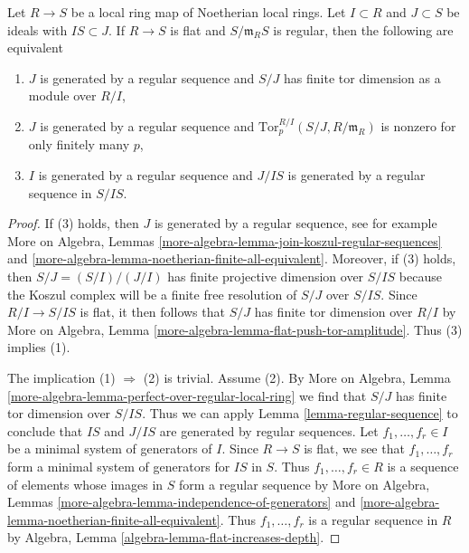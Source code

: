 \begin{lemma}
\label{lemma-perfect-map-ci}
Let $R \to S$ be a local ring map of Noetherian local rings.
Let $I \subset R$ and $J \subset S$ be ideals with
$IS \subset J$. If $R \to S$ is flat and $S/\mathfrak m_RS$ is
regular, then the following are equivalent
\begin{enumerate}
\item $J$ is generated by a regular sequence and
$S/J$ has finite tor dimension as a module over $R/I$,
\item $J$ is generated by a regular sequence and
$\text{Tor}^{R/I}_p(S/J, R/\mathfrak m_R)$ is nonzero
for only finitely many $p$,
\item $I$ is generated by a regular sequence
and $J/IS$ is generated by a regular sequence in $S/IS$.
\end{enumerate}
\end{lemma}

\begin{proof}
If (3) holds, then $J$ is generated by a regular sequence, see for example
More on Algebra, Lemmas
\ref{more-algebra-lemma-join-koszul-regular-sequences} and
\ref{more-algebra-lemma-noetherian-finite-all-equivalent}.
Moreover, if (3) holds, then $S/J = (S/I)/(J/I)$
has finite projective dimension over $S/IS$ because the Koszul
complex will be a finite free resolution of $S/J$ over $S/IS$.
Since $R/I \to S/IS$ is flat, it then follows that $S/J$ has finite
tor dimension over $R/I$ by
More on Algebra, Lemma \ref{more-algebra-lemma-flat-push-tor-amplitude}.
Thus (3) implies (1).

\medskip\noindent
The implication (1) $\Rightarrow$ (2) is trivial.
Assume (2). By
More on Algebra, Lemma \ref{more-algebra-lemma-perfect-over-regular-local-ring}
we find that $S/J$ has finite tor dimension over $S/IS$.
Thus we can apply Lemma \ref{lemma-regular-sequence}
to conclude that $IS$ and $J/IS$ are generated by regular sequences.
Let $f_1, \ldots, f_r \in I$ be a minimal system of generators of $I$.
Since $R \to S$ is flat, we see that $f_1, \ldots, f_r$ form a minimal
system of generators for $IS$ in $S$. Thus $f_1, \ldots, f_r \in R$
is a sequence of elements whose images in $S$ form a regular sequence
by More on Algebra, Lemmas
\ref{more-algebra-lemma-independence-of-generators} and
\ref{more-algebra-lemma-noetherian-finite-all-equivalent}.
Thus $f_1, \ldots, f_r$ is a regular sequence in $R$ by
Algebra, Lemma \ref{algebra-lemma-flat-increases-depth}.
\end{proof}





